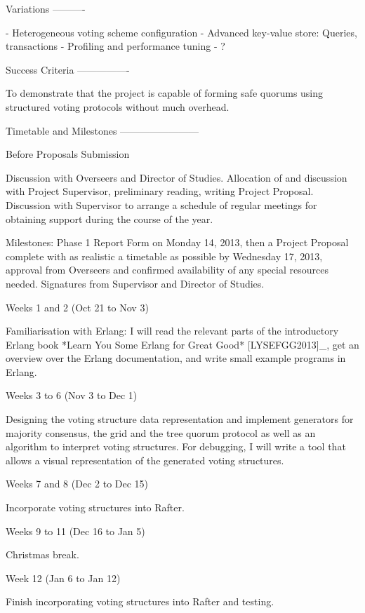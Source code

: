Variations
----------

- Heterogeneous voting scheme configuration
- Advanced key-value store: Queries, transactions
- Profiling and performance tuning
- ?

Success Criteria
----------------

To demonstrate that the project is capable of forming safe quorums using structured voting protocols without much overhead.

Timetable and Milestones
------------------------

Before Proposals Submission
~~~~~~~~~~~~~~~~~~~~~~~~~~~

Discussion with Overseers and Director of Studies. Allocation of and discussion with Project Supervisor, preliminary reading, writing Project Proposal. Discussion with Supervisor to arrange a schedule of regular meetings for obtaining support during the course of the year.

Milestones: Phase 1 Report Form on Monday 14, 2013, then a Project Proposal complete with as realistic a timetable as possible by Wednesday 17, 2013, approval from Overseers and confirmed availability of any special resources needed. Signatures from Supervisor and Director of Studies.

Weeks 1 and 2 (Oct 21 to Nov 3)
~~~~~~~~~~~~~~~~~~~~~~~~~~~~~~~

Familiarisation with Erlang: I will read the relevant parts of the introductory Erlang book *Learn You Some Erlang for Great Good* [LYSEFGG2013]_, get an overview over the Erlang documentation, and write small example programs in Erlang.

Weeks 3 to 6 (Nov 3 to Dec 1)
~~~~~~~~~~~~~~~~~~~~~~~~~~~~~

Designing the voting structure data representation and implement generators for majority consensus, the grid and the tree quorum protocol as well as an algorithm to interpret voting structures. For debugging, I will write a tool that allows a visual representation of the generated voting structures.

Weeks 7 and 8 (Dec 2 to Dec 15)
~~~~~~~~~~~~~~~~~~~~~~~~~~~~~~~

Incorporate voting structures into Rafter.

Weeks 9 to 11 (Dec 16 to Jan 5)
~~~~~~~~~~~~~~~~~~~~~~~~~~~~~~~

Christmas break.

Week 12 (Jan 6 to Jan 12)
~~~~~~~~~~~~~~~~~~~~~~~~~~~~~~~~~

Finish incorporating voting structures into Rafter and testing.

